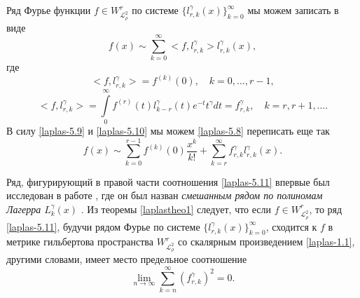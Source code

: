 %

Ряд Фурье функции $f\in W^r_{\mathcal{ L}^2_\rho}$ по системе $\{l_{r,k}^{\gamma}(x)\}_{k=0}^\infty$
мы можем записать в виде
\begin{equation}\label{laplas-5.8}
f(x)\sim  \sum_{k=0}^\infty <f,l_{r,k}^\gamma>  l_{r,k}^\gamma(x),
     \end{equation}
где
\begin{equation}\label{laplas-5.9}
<f,l_{r,k}^\gamma>=f^{(k)}(0),\quad k=0,\ldots, r-1,
     \end{equation}
\begin{equation}\label{laplas-5.10}
<f,l_{r,k}^\gamma>=\int\limits_0^\infty f^{(r)}(t) l_{k-r}^\gamma(t)e^{-t}t^\gamma dt=f_{r,k}^\gamma,\quad k=r,r+1,\ldots.
     \end{equation}
В силу \eqref{laplas-5.9}  и \eqref{laplas-5.10} мы можем \eqref{laplas-5.8} переписать еще так
\begin{equation}\label{laplas-5.11}
f(x)\sim \sum_{k=0}^{r-1} f^{(k)}(0)\frac{x^k}{k!}+ \sum_{k=r}^\infty f_{r,k}^\gamma l_{r,k}^\gamma(x).
\end{equation}

Ряд, фигурирующий в правой части соотношения \eqref{laplas-5.11} впервые был исследован в работе \cite{Shar13}, где он был назван \textit{ смешанным рядом по полиномам Лагерра $L_{k}^\gamma(x)$ }. Из теоремы \ref{laplastheo1} следует, что если $f\in W^r_{\mathcal{ L}^2_\rho}$, то ряд \eqref{laplas-5.11}, будучи  рядом Фурье  по системе $\{l_{r,k}^{\gamma}(x)\}_{k=0}^\infty$, сходится к $f$ в метрике гильбертова пространства $W^r_{\mathcal{ L}^2_\rho}$ со скалярным произведением \eqref{laplas-1.1}, другими словами, имеет место предельное соотношение
 \begin{equation*}
 \lim_{n\to\infty}\sum_{k=n}^\infty (f_{r,k}^\gamma)^2= 0 .
\end{equation*}

